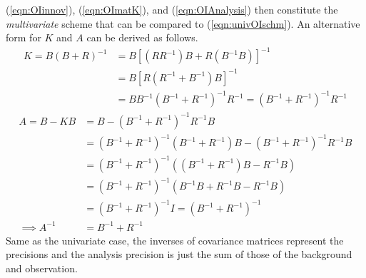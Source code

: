 (\ref{eqn:OIinnov}), (\ref{eqn:OImatK}), and (\ref{eqn:OIAnalysis}) then constitute the \textit{multivariate}  scheme that can be compared to (\ref{eqn:univOIschm}). An alternative form for $K$ and $A$ can be derived as follows.
\begin{align}
K = B(B+R)^{-1} &= B[(RR^{-1})B+R(B^{-1}B)]^{-1} \nonumber \\
&= B[R(R^{-1} + B^{-1})B]^{-1} \nonumber  \\
&= BB^{-1}(B^{-1} + R^{-1})^{-1}R^{-1} = (B^{-1} + R^{-1})^{-1}R^{-1} \label{eqn:OIKalt}
\end{align}
\begin{align}
A = B - KB &= B - (B^{-1} + R^{-1})^{-1}R^{-1} B \nonumber \\
&= (B^{-1} + R^{-1})^{-1}(B^{-1} + R^{-1})B - (B^{-1} + R^{-1})^{-1} R^{-1} B \nonumber \\
&= (B^{-1} + R^{-1})^{-1} ((B^{-1} + R^{-1})B - R^{-1} B) \nonumber \\
&= (B^{-1} + R^{-1})^{-1} (B^{-1}B + R^{-1}B - R^{-1} B) \nonumber \\
&= (B^{-1} + R^{-1})^{-1} I = (B^{-1} + R^{-1})^{-1} \nonumber \\
\implies A^{-1} &= B^{-1} + R^{-1}
\end{align}
Same as the univariate case, the inverses of covariance matrices represent the precisions and the analysis precision is just the sum of those of the background and observation. \par


